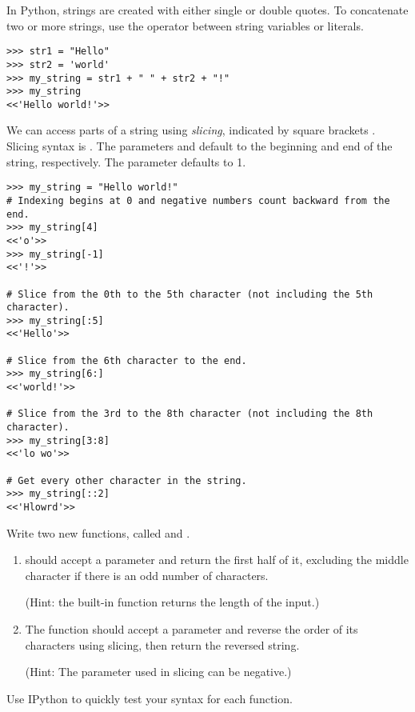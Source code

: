 In Python, strings are created with either single or double quotes.
To concatenate two or more strings, use the \li{+} operator between string variables or literals.
\begin{lstlisting}
>>> str1 = "Hello"
>>> str2 = 'world'
>>> my_string = str1 + " " + str2 + "!"
>>> my_string
<<'Hello world!'>>
\end{lstlisting}

We can access parts of a string using \emph{slicing}, indicated by square brackets \li{[ ]}.
Slicing syntax is .
The parameters  and  default to the beginning and end of the string, respectively.
The parameter  defaults to 1.

\begin{lstlisting}
>>> my_string = "Hello world!"
# Indexing begins at 0 and negative numbers count backward from the end.
>>> my_string[4]
<<'o'>>
>>> my_string[-1]
<<'!'>>

# Slice from the 0th to the 5th character (not including the 5th character).
>>> my_string[:5]
<<'Hello'>>

# Slice from the 6th character to the end.
>>> my_string[6:]
<<'world!'>>

# Slice from the 3rd to the 8th character (not including the 8th character).
>>> my_string[3:8]
<<'lo wo'>>

# Get every other character in the string.
>>> my_string[::2]
<<'Hlowrd'>>
\end{lstlisting}

\begin{problem} %
Write two new functions, called  and .
\begin{enumerate}
\item {} should accept a parameter and return the first half of it, excluding the middle character if there is an odd number of characters.

(Hint: the built-in function  returns the length of the input.)
\item The  function should accept a parameter and reverse the order of its characters using slicing, then return the reversed string.

(Hint: The  parameter used in slicing can be negative.)
\end{enumerate}
Use IPython to quickly test your syntax for each function.
\end{problem}

